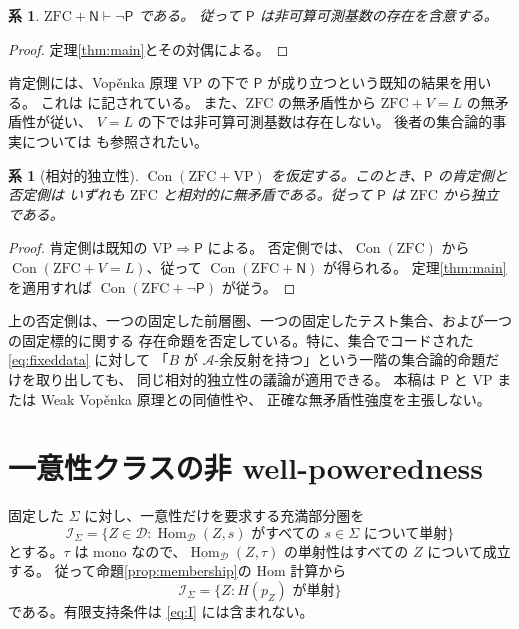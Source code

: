 \documentclass[a4paper,11pt]{ltjsarticle}
\theoremstyle{japaneseplain}
\newtheorem{corollary}[theorem]{系}
\newcommand{\D}{\mathcal D}
\newcommand{\A}{\mathcal A}
\newcommand{\Ical}{\mathcal I}
\newcommand{\Naxiom}{\mathsf N}
\newcommand{\Pstmt}{\mathsf P}
\newcommand{\Hom}{\operatorname{Hom}}
\newcommand{\Con}{\operatorname{Con}}
\begin{document}
\begin{corollary}\label{cor:measurable}
$\mathrm{ZFC}+\Naxiom\vdash\neg\Pstmt$ である。
従って $\Pstmt$ は非可算可測基数の存在を含意する。
\end{corollary}
\begin{proof}
定理\ref{thm:main}とその対偶による。
\end{proof}

肯定側には、Vopěnka 原理 $\mathrm{VP}$ の下で $\Pstmt$ が成り立つという既知の結果を用いる。
これは \cite[p.~295, Problem~1; Theorem~6.28]{AR94} に記されている。
また、$\mathrm{ZFC}$ の無矛盾性から $\mathrm{ZFC}+V=L$ の無矛盾性が従い、
$V=L$ の下では非可算可測基数は存在しない。
後者の集合論的事実については \cite[\S9]{Shulman08} も参照されたい。

\begin{corollary}[相対的独立性]\label{cor:independence}
$\Con(\mathrm{ZFC}+\mathrm{VP})$ を仮定する。このとき、$\Pstmt$ の肯定側と否定側は
いずれも $\mathrm{ZFC}$ と相対的に無矛盾である。従って $\Pstmt$ は $\mathrm{ZFC}$ から独立である。
\end{corollary}
\begin{proof}
肯定側は既知の $\mathrm{VP}\Rightarrow\Pstmt$ による。
否定側では、$\Con(\mathrm{ZFC})$ から
$\Con(\mathrm{ZFC}+V=L)$、従って $\Con(\mathrm{ZFC}+\Naxiom)$ が得られる。
定理\ref{thm:main}を適用すれば $\Con(\mathrm{ZFC}+\neg\Pstmt)$ が従う。
\end{proof}

上の否定側は、一つの固定した前層圏、一つの固定したテスト集合、および一つの固定標的に関する
存在命題を否定している。特に、集合でコードされた \eqref{eq:fixeddata} に対して
「$B$ が $\A$-余反射を持つ」という一階の集合論的命題だけを取り出しても、
同じ相対的独立性の議論が適用できる。
本稿は $\Pstmt$ と $\mathrm{VP}$ または Weak Vopěnka 原理との同値性や、
正確な無矛盾性強度を主張しない。

\appendix
\renewcommand{\thetheorem}{\Alph{section}.\arabic{theorem}}
\section{一意性クラスの非 well-poweredness}\label{app:mono}

固定した $\Sigma$ に対し、一意性だけを要求する充満部分圏を
\[
 \Ical_\Sigma
 =\{Z\in\D:\Hom_\D(Z,s)\text{ がすべての }s\in\Sigma\text{ について単射}\}
\]
とする。$\tau$ は mono なので、$\Hom_\D(Z,\tau)$ の単射性はすべての $Z$ について成立する。
従って命題\ref{prop:membership}の Hom 計算から
\begin{equation}\label{eq:I}
 \Ical_\Sigma=\{Z:H(p_Z)\text{ が単射}\}
\end{equation}
である。有限支持条件は \eqref{eq:I} には含まれない。
\end{document}
